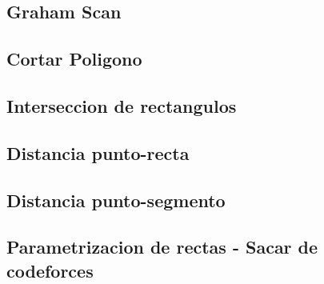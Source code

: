 \subsection{Graham Scan}
\subsection{Cortar Poligono}

\subsection{Interseccion de rectangulos}

\subsection{Distancia punto-recta}


\subsection{Distancia punto-segmento}

\subsection{Parametrizacion de rectas - Sacar de codeforces}


